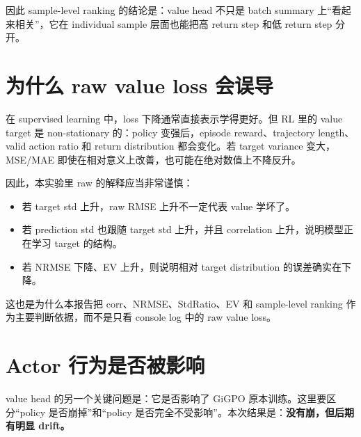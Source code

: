 \documentclass[10pt]{ctexart}
\begin{document}
因此 sample-level ranking 的结论是：value head 不只是 batch summary 上“看起来相关”，它在 individual sample 层面也能把高 return step 和低 return step 分开。

\section{为什么 raw value loss 会误导}
在 supervised learning 中，loss 下降通常直接表示学得更好。但 RL 里的 value target 是 non-stationary 的：policy 变强后，episode reward、trajectory length、valid action ratio 和 return distribution 都会变化。若 target variance 变大，MSE/MAE 即使在相对意义上改善，也可能在绝对数值上不降反升。

因此，本实验里 raw  的解释应当非常谨慎：
\begin{itemize}
  \item 若 target std 上升，raw RMSE 上升不一定代表 value 学坏了。
  \item 若 prediction std 也跟随 target std 上升，并且 correlation 上升，说明模型正在学习 target 的结构。
  \item 若 NRMSE 下降、EV 上升，则说明相对 target distribution 的误差确实在下降。
\end{itemize}

这也是为什么本报告把 corr、NRMSE、StdRatio、EV 和 sample-level ranking 作为主要判断依据，而不是只看 console log 中的 raw value loss。

\section{Actor 行为是否被影响}
value head 的另一个关键问题是：它是否影响了 GiGPO 原本训练。这里要区分“policy 是否崩掉”和“policy 是否完全不受影响”。本次结果是：\textbf{没有崩，但后期有明显 drift。}
\end{document}
